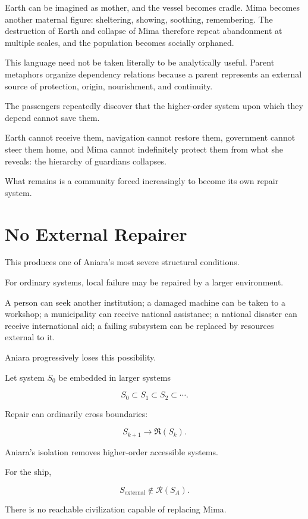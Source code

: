 \documentclass[11pt,oneside]{book}
\theoremstyle{definition}
\theoremstyle{remark}
\newcommand{\R}{\mathcal{R}}
\newcommand{\Repair}{\mathfrak{R}}
\begin{document}
Earth can be imagined as mother, and the vessel becomes cradle. Mima becomes another maternal figure: sheltering, showing, soothing, remembering. The destruction of Earth and collapse of Mima therefore repeat abandonment at multiple scales, and the population becomes socially orphaned.

This language need not be taken literally to be analytically useful. Parent metaphors organize dependency relations because a parent represents an external source of protection, origin, nourishment, and continuity.

The passengers repeatedly discover that the higher-order system upon which they depend cannot save them.

Earth cannot receive them, navigation cannot restore them, government cannot steer them home, and Mima cannot indefinitely protect them from what she reveals: the hierarchy of guardians collapses.

What remains is a community forced increasingly to become its own repair system.

\section{No External Repairer}

This produces one of Aniara's most severe structural conditions.

For ordinary systems, local failure may be repaired by a larger environment.

A person can seek another institution; a damaged machine can be taken to a workshop; a municipality can receive national assistance; a national disaster can receive international aid; a failing subsystem can be replaced by resources external to it.

Aniara progressively loses this possibility.

Let system \(S_0\) be embedded in larger systems

\[
S_0\subset S_1\subset S_2\subset\cdots.
\]

Repair can ordinarily cross boundaries:

\[
S_{k+1}\rightarrow\Repair(S_k).
\]

Aniara's isolation removes higher-order accessible systems.

For the ship,

\[
S_{\mathrm{external}}
\notin\R(S_A).
\]

There is no reachable civilization capable of replacing Mima.
\end{document}
